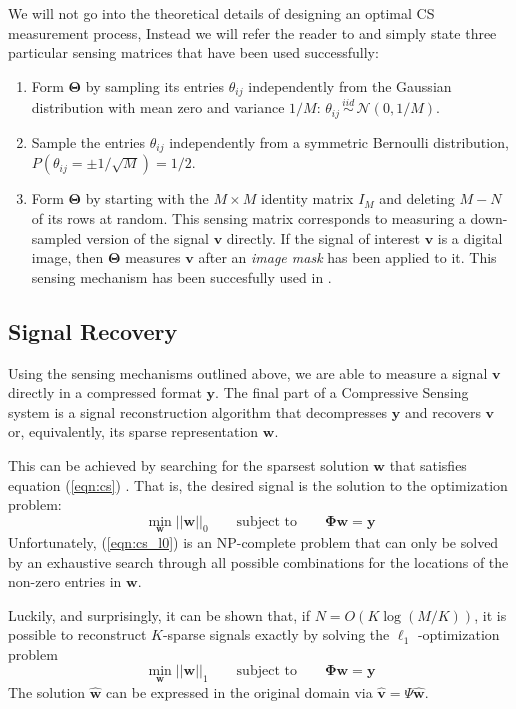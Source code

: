 We will not go into the theoretical details of designing an optimal CS measurement process, Instead we will refer the reader to \cite{candes2008} and simply state three particular sensing matrices that have been used successfully:
\begin{enumerate}
\item Form $\bm\Theta$ by sampling its entries $\theta_{ij}$ independently from the Gaussian distribution with mean zero and variance $1/M$: $\theta_{ij}\, \stackrel{iid}{\sim}\, \mathcal{N}(0,1/M)$.
\item Sample the entries $\theta_{ij}$ independently from a symmetric Bernoulli distribution, $P(\theta_{ij} = \pm 1/\sqrt{M}) = 1/2$. 
\item Form $\bm\Theta$ by starting with the $M\times M$ identity matrix $I_M$ and deleting $M-N$ of its rows at random. This sensing matrix corresponds to measuring a down-sampled version of the signal $\bm v$ directly. If the signal of interest $\bm v$ is a digital image, then $\bm\Theta$ measures $\bm v$ after an \emph{image mask} has been applied to it. This sensing mechanism has been succesfully used in \cite{pilikos2014}.
\end{enumerate}

\subsection{Signal Recovery}
Using the sensing mechanisms outlined above, we are able to measure a signal $\bm v$ directly in a compressed format $\bm y$.
The final part of a Compressive Sensing system is a signal reconstruction algorithm that decompresses $\bm y$ and recovers $\bm v$ or, equivalently, its sparse representation $\bm w$.

This can be achieved by searching for the sparsest solution $\bm w$ that satisfies equation (\ref{eqn:cs}) \cite{baraniuk2007}.
That is, the desired signal is the solution to the optimization problem:
\begin{equation}
\label{eqn:cs_l0}
  \min_{\bm w} ||\bm w||_0 \qquad \mbox{subject to} \qquad \bm\Phi\bm w = \bm y
\end{equation}
Unfortunately, (\ref{eqn:cs_l0}) is an NP-complete problem that can only be solved by an exhaustive search through all possible combinations for the locations of the non-zero entries in $\bm w$.

Luckily, and surprisingly, it can be shown that, if $N = O(K\log(M/K))$, it is possible to reconstruct $K$-sparse signals exactly by solving the $\ell_1$ -optimization problem \cite{baraniuk2007,candes2008}
\begin{equation}
\label{eqn:cs_l1}
  \min_{\bm w} ||\bm w||_1 \qquad \mbox{subject to} \qquad \bm\Phi\bm w = \bm y
\end{equation}
The solution $\bm{\hat w}$ can be expressed in the original domain via $\bm{\hat v} = \Psi\bm{\hat w}$.

